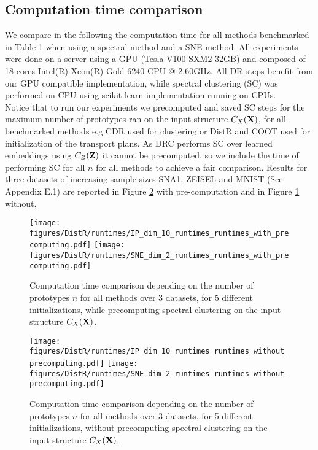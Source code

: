 \subsection{Computation time comparison}\label{sec:compute_time}

We compare in the following the computation time for all methods benchmarked in Table 1 when using a spectral method and a SNE method. All experiments were done on a server using a GPU (Tesla V100-SXM2-32GB) and composed of 18 cores Intel(R) Xeon(R) Gold 6240 CPU @ 2.60GHz. All DR steps benefit from our GPU compatible implementation, while spectral clustering (SC) was performed on CPU using scikit-learn implementation running on CPUs.\\ Notice that to run our experiments we precomputed and saved SC steps for the maximum number of prototypes ran on the input structure $C_X({\mathbf{X}})$, for all benchmarked methods e.g CDR used for clustering or DistR and COOT used for initialization of the transport plans. As DRC performs SC over learned embeddings using $C_Z({\mathbf{Z}})$ it cannot be precomputed, so we include the time of performing SC for all $n$ for all methods to achieve a fair comparison. Results for three datasets of increasing sample sizes SNA1, ZEISEL and MNIST (See Appendix E.1) are reported in Figure \ref{fig:runtimes1} with pre-computation and in Figure \ref{fig:runtimes2}  without.

\begin{figure}[h!]
    \begin{center}
        \texttt{[image: figures/DistR/runtimes/IP\_dim\_10\_runtimes\_runtimes\_with\_precomputing.pdf]}
        \texttt{[image: figures/DistR/runtimes/SNE\_dim\_2\_runtimes\_runtimes\_with\_precomputing.pdf]}
    \end{center}
    \caption{\label{fig:runtimes2}Computation time comparison depending on the number of prototypes $n$ for all methods over 3 datasets, for 5 different initializations, while precomputing spectral clustering on the input structure $C_X({\mathbf{X}})$.}
\end{figure}
\begin{figure}[h!]
    \begin{center}
        \texttt{[image: figures/DistR/runtimes/IP\_dim\_10\_runtimes\_runtimes\_without\_precomputing.pdf]}
        \texttt{[image: figures/DistR/runtimes/SNE\_dim\_2\_runtimes\_runtimes\_without\_precomputing.pdf]}
    \end{center}
    \caption{\label{fig:runtimes1}Computation time comparison depending on the number of prototypes $n$ for all methods over 3 datasets, for 5 different initializations,  \underline{without} precomputing spectral clustering on the input structure $C_X({\mathbf{X}})$.}
\end{figure}

